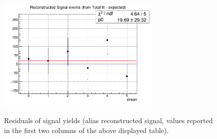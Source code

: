 \begin{table}[b]
    \centering
    \caption{Charged anticorrelated decays: comparison of fitted and expected signal yields, fitted and truth-matched total signal for six streams of Belle generic MC when fitting the two dimensional distributions of $M_{bc}$ and $M(p K \pi)$.}
    \label{tab:SixStreams_chargedAntiLam2Dfits}
    \end{table}

    \begin{figure}[H]
        \centering
        {\includegraphics[width=0.70\textwidth]{04-SimultaneousFit/figs/6streamsResults_chargedAnticorrelated.png}}
        \caption{Residuals of signal yields (alias reconstructed signal, values reported in the first two columns of the above displayed table).}
        \label{fig:6streamsResults_chargedAnticorrelated}
        \end{figure}

